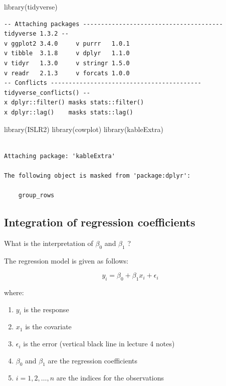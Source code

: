 \documentclass[
  letterpaper,
  DIV=11,
  numbers=noendperiod]{scrartcl}
\newenvironment{Shaded}{\begin{snugshade}}{\end{snugshade}}
\newcommand{\FunctionTok}[1]{\textcolor[rgb]{0.28,0.35,0.67}{#1}}
\newcommand{\NormalTok}[1]{\textcolor[rgb]{0.00,0.23,0.31}{#1}}
\providecommand{\tightlist}{%
  \setlength{\itemsep}{0pt}\setlength{\parskip}{0pt}}\usepackage{longtable,booktabs,array}
\begin{document}
\begin{Shaded}
\begin{Highlighting}[]
\FunctionTok{library}\NormalTok{(tidyverse)}
\end{Highlighting}
\end{Shaded}

\begin{verbatim}
-- Attaching packages --------------------------------------- tidyverse 1.3.2 --
v ggplot2 3.4.0     v purrr   1.0.1
v tibble  3.1.8     v dplyr   1.1.0
v tidyr   1.3.0     v stringr 1.5.0
v readr   2.1.3     v forcats 1.0.0
-- Conflicts ------------------------------------------ tidyverse_conflicts() --
x dplyr::filter() masks stats::filter()
x dplyr::lag()    masks stats::lag()
\end{verbatim}

\begin{Shaded}
\begin{Highlighting}[]
\FunctionTok{library}\NormalTok{(ISLR2)}
\FunctionTok{library}\NormalTok{(cowplot)}
\FunctionTok{library}\NormalTok{(kableExtra)}
\end{Highlighting}
\end{Shaded}

\begin{verbatim}

Attaching package: 'kableExtra'

The following object is masked from 'package:dplyr':

    group_rows
\end{verbatim}

\hypertarget{integration-of-regression-coefficients}{%
\subsection{Integration of regression
coefficients}\label{integration-of-regression-coefficients}}

What is the interpretation of \(\beta_0\) and \(\beta_1\) ?

The regression model is given as follows:

\[
y_i = \beta_0 + \beta_1 x_i + \epsilon_i
\]

where:

\begin{enumerate}
\def\labelenumi{\arabic{enumi}.}
\tightlist
\item
  \(y_i\) is the response
\item
  \(x_1\) is the covariate
\item
  \(\epsilon_i\) is the error (vertical black line in lecture 4 notes)
\item
  \(\beta_0\) and \(\beta_1\) are the regression coefficients
\item
  \(i = 1, 2, \dots, n\) are the indices for the observations
\end{enumerate}
\end{document}

